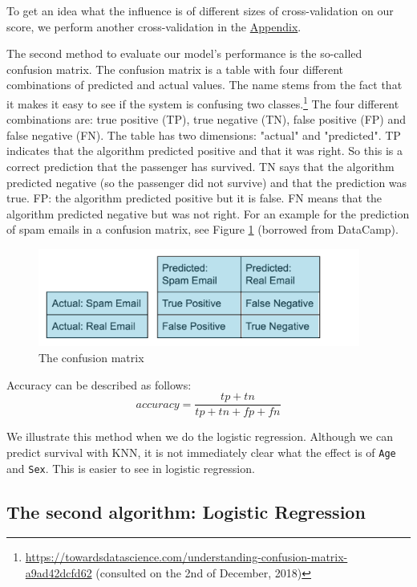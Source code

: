 \documentclass[11pt]{article}
\begin{document}
To get an idea what the influence is of different sizes of cross-validation on our score, we perform another cross-validation in the \hyperref[sec:appendix]{Appendix}.  

The second method to evaluate our model's performance is the so-called confusion matrix. The confusion matrix is a table with four different combinations of predicted and actual values. The name stems from the fact that it makes it easy to see if the system is confusing two classes.\footnote{\url{https://towardsdatascience.com/understanding-confusion-matrix-a9ad42dcfd62} (consulted on the 2nd of December, 2018)} The four different combinations are: true positive (TP), true negative (TN), false positive (FP) and false negative (FN). The table has two dimensions: "actual" and "predicted". TP indicates that the algorithm predicted positive and that it was right. So this is a correct prediction that the passenger has survived. TN says that the algorithm predicted negative (so the passenger did not survive) and that the prediction was true. FP: the algorithm predicted positive but it is false. FN means that the algorithm predicted negative but was not right. For an example for the prediction of spam emails in a confusion matrix, see Figure \ref{tab:matrix} (borrowed from DataCamp).  
\begin{figure}[htbp]
\centering
\includegraphics[width=400]{./CONFUSIONMATRIX.png}
\caption{\label{tab:matrix}
The confusion matrix}
\end{figure}

Accuracy can be described as follows: 
\begin{equation}
accuracy = \frac{tp+tn}{tp+tn+fp+fn}
\end{equation}

We illustrate this method when we do the logistic regression. Although we can predict survival with KNN, it is not immediately clear what the effect is of \texttt{Age} and \texttt{Sex}. This is easier to see in logistic regression. 


\newpage
\subsection{The second algorithm: Logistic Regression}
\label{sec:orgfb113b3}
\end{document}
